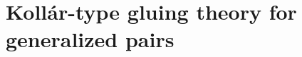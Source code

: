 \documentclass[11pt]{amsart}
\numberwithin{equation}{section}
\newcommand{\Mm}{{\bf{M}}}
\newcommand{\Src}{\mathrm{Src}}
\theoremstyle{definition}
\newtheorem{defn}[thm]{Definition}
\theoremstyle{definition}
\newtheorem{defthm}[thm]{Definition-Theorem}
\theoremstyle{definition}
\begin{document}
\begin{comment}

\subsection{Sources and springs of generalized log canonical centers
}
The following theorem is an analogue of \cite[Theorem-Definition 4.45]{Kol13}. This theorem is for separate interest while We do not need the theorem in the rest of the paper.

\begin{defn}
Let $(X_1,B_1,\Mm^1)$ and $(X_2,B_2,\Mm^2)$ be two glc g-pairs. We say that $(X_1,B_1,\Mm^1)$ and $(X_2,B_2,\Mm^2)$ are in the same \emph{crepant-birational equivalence class} if $\Mm^1=\Mm^2$, and there exist two birational maps $p_1: W\rightarrow X_1$ and $p_2: W\rightarrow X_2$, such that $p_1^*(K_{X_1}+B_1+\Mm^1_{X_1})=p_2^*(K_{X_2}+B_2+\Mm^2_{X_2})$.
\end{defn}

\begin{defthm}\label{thm: kol13 4.45 gpair}
Let $(X,B,\Mm)\rightarrow Y$ be a gdlt crepant log structure and $Z\subset Y$ a glc center with normalization $n: Z^n\rightarrow Z$. Let $S\subset X$ be glc center of $(X,B,\Mm)$ which dominates $Z$ and is minimal with respect to inclusion. Let $(S,B_S,\Mm^S)/Y$ be the gdlt g-pair induced by the adjunction
$$K_S+B_S+\Mm^S_S:=(K_X+B+\Mm_X)|_S$$
and let $f^n_S: S\rightarrow Z_S\rightarrow Z^n$ be the Stein factorization. Then:
\begin{enumerate}
    \item (Uniqueness of sources) The crepant-birational equivalence class of $(S,B_S,\Mm^S)$ does not depend on the choice of $S$. This crepant-birational equivalence class of $(S,B_S,\Mm^S)$ will be called as the \emph{source of $Z$} and is denoted by $\Src(Z,X,B,\Mm)$.
    \item (Uniqueness of springs)
    \item (Crepant log structure)
    \item (Poincar\'e residue map) (isom is not canonical)
    \item (Galois property)
    \item (Adjunction)
    \item (Birational invariance)
\end{enumerate}
\end{defthm}
\end{comment}

\section{Koll\'ar-type gluing theory for generalized pairs}\label{sec: gluing}
\end{document}

